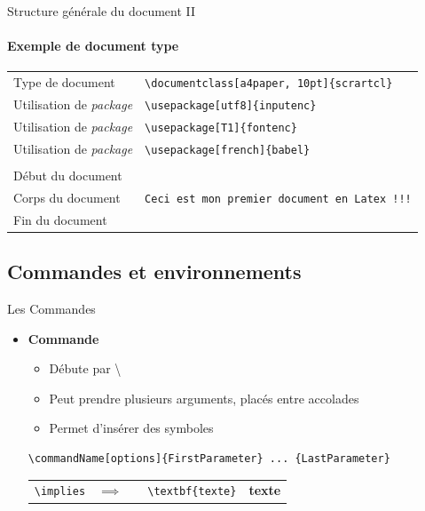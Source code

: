 \begin{frame}[fragile]{Structure générale du document II}
  \framesubtitle{Exemple de document type}
  \small
  \begin{tabular}{ll}
    Type de document &
    \lstinline|\documentclass[a4paper, 10pt]{scrartcl}|\\
    Utilisation de \textit{package} &
    \lstinline|\usepackage[utf8]{inputenc}|\\
    Utilisation de \textit{package} &
    \lstinline|\usepackage[T1]{fontenc}|\\
    Utilisation de \textit{package} &
    \lstinline|\usepackage[french]{babel}|\\
     &\\
    Début du document &
    \lstinline||\\
    Corps du document &
    \lstinline|Ceci est mon premier document en Latex !!!|\\
    Fin du document &
    \lstinline||\\
  \end{tabular}
\end{frame}

\subsection{Commandes et environnements}

\begin{frame}[fragile]{Les Commandes}
  \begin{itemize}
  \item \textbf{Commande}
      \begin{itemize}
      \item Débute par \textbackslash
      \item Peut prendre plusieurs arguments, placés entre accolades
      \item Permet d'insérer des symboles
      \end{itemize}
      \begin{lstlisting}[style=nonumbers]
  \commandName[options]{FirstParameter} ... {LastParameter}
      \end{lstlisting}
      \begin{center}
      \begin{tabular}{lllll}
      \lstinline|\implies| & $\implies$ & & \lstinline|\textbf{texte}| & \textbf{texte}
      \end{tabular}
      \end{center}
  \end{itemize}
\end{frame}

